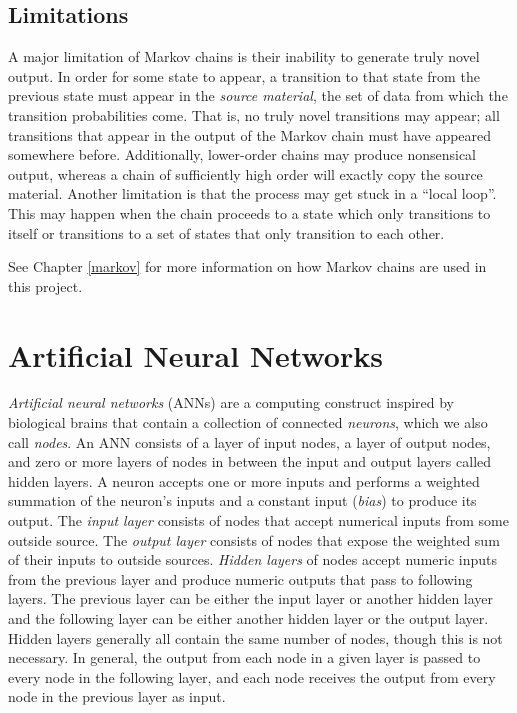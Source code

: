 \subsection{Limitations} \label{bg:markov:limitations}

A major limitation of Markov chains is their inability to generate truly novel output.
In order for some state to appear, a transition to that state from the previous state must appear in the \textit{source material}, the set of data from which the transition probabilities come.
That is, no truly novel transitions may appear; all transitions that appear in the output of the Markov chain must have appeared somewhere before.
Additionally, lower-order chains may produce nonsensical output, whereas a chain of sufficiently high order will exactly copy the source material.
Another limitation is that the process may get stuck in a ``local loop''.
This may happen when the chain proceeds to a state which only transitions to itself or transitions to a set of states that only transition to each other.

See Chapter \ref{markov} for more information on how Markov chains are used in this project.

\section{Artificial Neural Networks} \label{bg:nn}

\textit{Artificial neural networks} (ANNs) are a computing construct inspired by biological brains that contain a collection of connected \textit{neurons}, which we also call \textit{nodes}.
An ANN consists of a layer of input nodes, a layer of output nodes, and zero or more layers of nodes in between the input and output layers called hidden layers.
A neuron accepts one or more inputs and performs a weighted summation of the neuron's inputs and a constant input (\textit{bias}) to produce its output.
The \textit{input layer} consists of nodes that accept numerical inputs from some outside source.
The \textit{output layer} consists of nodes that expose the weighted sum of their inputs to outside sources.
\textit{Hidden layers} of nodes accept numeric inputs from the previous layer and produce numeric outputs that pass to following layers.
The previous layer can be either the input layer or another hidden layer and the following layer can be either another hidden layer or the output layer.
Hidden layers generally all contain the same number of nodes, though this is not necessary.
In general, the output from each node in a given layer is passed to every node in the following layer, and each node receives the output from every node in the previous layer as input.

